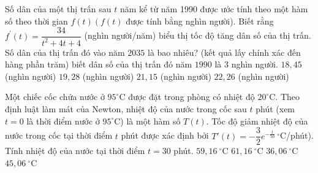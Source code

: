 \begin{ex}
	Số dân của một thị trấn sau $t$ năm kể từ năm 1990 được ước tính theo một hàm số theo thời gian $f(t)\left(f(t)\right.$ được tính bằng nghìn người). Biết rằng $f^{\prime}(t)=\dfrac{34}{t^2+4 t+4}$ (nghìn người/năm) biểu thị tốc độ tăng dân số của thị trấn. Số dân của thị trấn đó vào năm $2035$ là bao nhiêu? (kết quả lấy chính xác đến hàng phần trăm) biết dân số của thị trấn đó năm $1990$ là $3$ nghìn người.
	\choice
	{$18,45$ (nghìn người)}
	{\True $19,28$ (nghìn người)}
	{$21,15$ (nghìn người)}
	{$22,26$ (nghìn người)}
\end{ex}
\begin{ex}
	Một chiếc cốc chứa nước ở $95^{\circ}$C được đặt trong phòng có nhiệt độ $20^{\circ}$C. Theo định luật làm mát của Newton, nhiệt độ của nước trong cốc sau $t$ phút (xem $t=0$ là thời điểm nước ở $95^{\circ}$C) là một hàm số $T(t)$. Tốc độ giảm nhiệt độ của nước trong cốc tại thời điểm $t$ phút được xác định bởi $T'(t)=-\dfrac{3}{2} e^{-\tfrac{t}{50}}\, ^{\circ}$C/phút). Tính nhiệt độ của nước tại thời điểm $t=30$ phút.
	\choice
	{ $59{,}16 \ ^{\circ}\text{C}$}
	{\True $61{,}16 \ ^{\circ}\text{C}$}
	{ $36{,}06 \ ^{\circ}\text{C}$}
	{ $45{,}06 \ ^{\circ}\text{C}$}
\end{ex}

